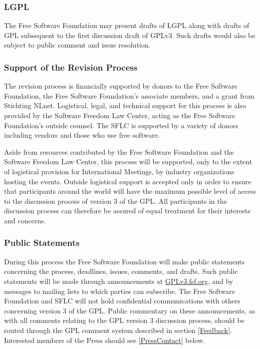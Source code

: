 \documentclass[a4paper,spanish,12pt]{book}
\begin{document}
\subsubsection{LGPL} The Free Software Foundation may present drafts of LGPL
along with drafts of GPL subsequent to the first discussion draft of
GPLv3.  Such drafts would also be subject to public comment and issue
resolution.

\subsubsection{Support of the Revision Process} The revision process is
financially supported by donors to the Free Software Foundation, the
Free Software Foundation's associate members, and a grant from
Stichting NLnet.  Logistical, legal, and technical support for this
process is also provided by the Software Freedom Law Center, acting as
the Free Software Foundation's outside counsel.  The SFLC is supported
by a variety of donors including vendors and those who use free
software.

Aside from resources contributed by the Free Software Foundation and
the Software Freedom Law Center, this process will be supported, only
to the extent of logistical provision for International Meetings, by
industry organizations hosting the events.  Outside logistical support
is accepted only in order to ensure that participants around the world
will have the maximum possible level of access to the discussion
process of version 3 of the GPL\@.  All participants in the discussion
process can therefore be assured of equal treatment for their
interests and concerns.

\subsubsection{Public Statements} During this process the Free Software
Foundation will make public statements concerning the process,
deadlines, issues, comments, and drafts.  Such public statements will
be made through announcements at \url{GPLv3.fsf.org}, and by
messages to mailing lists to which parties can subscribe.  The Free
Software Foundation and SFLC will not hold confidential communications
with others concerning version 3 of the GPL\@.  Public commentary on
these announcements, as with all comments relating to the GPL version
3 discussion process, should be routed through the GPL comment system
described in section \ref{Feedback}.  Interested members of the Press
should see \ref{PressContact} below.
\end{document}
